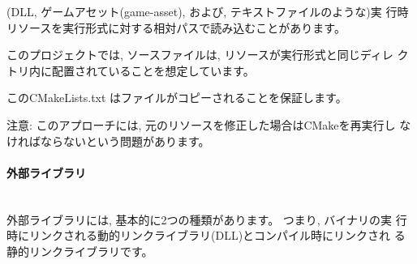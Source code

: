 \documentclass[uplatex,11pt,a4paper,landscape,dvipdfmx]{jsarticle} %
\newcommand{\sectiontitle}[1]{\paragraph{#1} \ \\} %
\begin{document}
\begin{multicols}{2}
(DLL, ゲームアセット(game-asset), および, テキストファイルのような)実
行時リソースを実行形式に対する相対パスで読み込むことがあります。

\vspace{\baselineskip} %
\noindent{}

このプロジェクトでは, ソースファイルは, リソースが実行形式と同じディレ
クトリ内に配置されていることを想定しています。



このCMakeLists.txt はファイルがコピーされることを保証します。



注意: このアプローチには, 元のリソースを修正した場合はCMakeを再実行し
なければならないという問題があります。

\sectiontitle{外部ライブラリ}

外部ライブラリには, 基本的に2つの種類があります。 つまり, バイナリの実
行時にリンクされる動的リンクライブラリ(DLL)とコンパイル時にリンクされ
る静的リンクライブラリです。 



\end{multicols}
\end{document}
